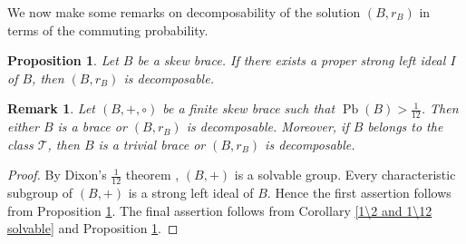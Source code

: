 \documentclass[11pt, oneside]{amsart}
\numberwithin{equation}{section}
\theoremstyle{plain}
\newtheorem{pro}[equation]{Proposition}
\newtheorem{rem}[equation]{Remark}
\theoremstyle{definition}
\newcommand{\Pb}{\operatorname{Pb} }
\begin{document}
We now make some remarks on decomposability of the solution $(B, r_B)$ in terms of the commuting probability.

\begin{pro}\cite[Proposition 2.5]{JKAV19}\label{strong ideal and SYBE}
    Let $B$ be a skew brace. If there exists a proper strong left ideal $I$ of $B$, then $(B,r_B)$ is decomposable.
\end{pro} 

\begin{rem}
    Let $(B,+,\circ)$ be a finite skew brace such that $\Pb(B)>\frac{1}{12}$. Then either $B$ is a brace or $(B,r_B)$ is decomposable. Moreover, if $B$ belongs to the class $\mathcal{T}$, then $B$ is a trivial brace or $(B,r_B)$ is decomposable.
\end{rem}
\begin{proof}
     By Dixon's $\frac{1}{12}$ theorem \cite{D73}, $(B,+) $ is a solvable group. Every characteristic subgroup of $(B,+)$ is a strong left ideal of $B$. Hence the first assertion follows from Proposition \ref{strong ideal and SYBE}.
   The final assertion  follows from Corollary \ref{1\2 and 1\12 solvable} and Proposition \ref{strong ideal and SYBE}. 
\end{proof}

 
\end{document}
